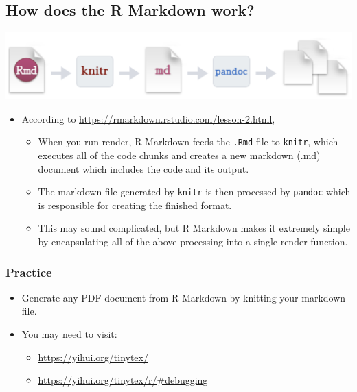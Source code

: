 \documentclass[
]{book}
\providecommand{\tightlist}{%
  \setlength{\itemsep}{0pt}\setlength{\parskip}{0pt}}
\begin{document}
\subsection{How does the R Markdown work?}\label{how-does-the-r-markdown-work}

\includegraphics{./img/rmarkdown_works.png}

\begin{itemize}
\tightlist
\item
  According to \url{https://rmarkdown.rstudio.com/lesson-2.html},

  \begin{itemize}
  \tightlist
  \item
    When you run render, R Markdown feeds the \texttt{.Rmd} file to \texttt{knitr}, which executes all of the code chunks and creates a new markdown (.md) document which includes the code and its output.
  \item
    The markdown file generated by \texttt{knitr} is then processed by \texttt{pandoc} which is responsible for creating the finished format.
  \item
    This may sound complicated, but R Markdown makes it extremely simple by encapsulating all of the above processing into a single render function.
  \end{itemize}
\end{itemize}

\subsubsection{Practice}\label{practice}

\begin{itemize}
\tightlist
\item
  Generate any PDF document from R Markdown by knitting your markdown file.
\item
  You may need to visit:

  \begin{itemize}
  \tightlist
  \item
    \url{https://yihui.org/tinytex/}
  \item
    \url{https://yihui.org/tinytex/r/\#debugging}
  \end{itemize}
\end{itemize}
\end{document}
